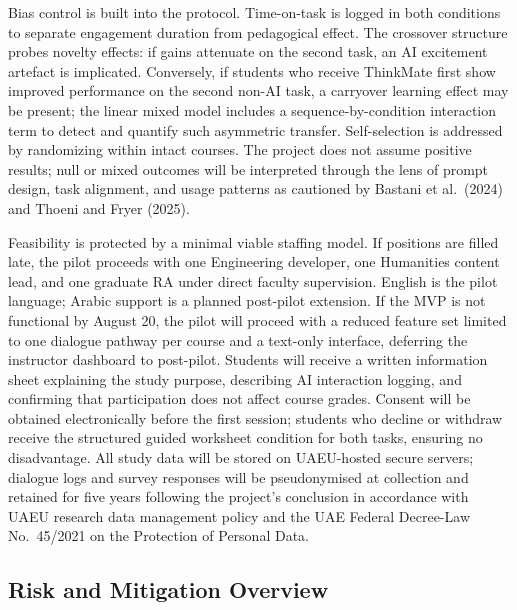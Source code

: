 \documentclass[11pt,a4paper]{article}
\begin{document}
Bias control is built into the protocol. Time-on-task is logged in both conditions to separate engagement duration from pedagogical effect. The crossover structure probes novelty effects: if gains attenuate on the second task, an AI excitement artefact is implicated. Conversely, if students who receive ThinkMate first show improved performance on the second non-AI task, a carryover learning effect may be present; the linear mixed model includes a sequence-by-condition interaction term to detect and quantify such asymmetric transfer. Self-selection is addressed by randomizing within intact courses. The project does not assume positive results; null or mixed outcomes will be interpreted through the lens of prompt design, task alignment, and usage patterns as cautioned by Bastani et al.\ (2024) and Thoeni and Fryer (2025).

Feasibility is protected by a minimal viable staffing model. If positions are filled late, the pilot proceeds with one Engineering developer, one Humanities content lead, and one graduate RA under direct faculty supervision. English is the pilot language; Arabic support is a planned post-pilot extension. If the MVP is not functional by August 20, the pilot will proceed with a reduced feature set limited to one dialogue pathway per course and a text-only interface, deferring the instructor dashboard to post-pilot. Students will receive a written information sheet explaining the study purpose, describing AI interaction logging, and confirming that participation does not affect course grades. Consent will be obtained electronically before the first session; students who decline or withdraw receive the structured guided worksheet condition for both tasks, ensuring no disadvantage. All study data will be stored on UAEU-hosted secure servers; dialogue logs and survey responses will be pseudonymised at collection and retained for five years following the project's conclusion in accordance with UAEU research data management policy and the UAE Federal Decree-Law No.\ 45/2021 on the Protection of Personal Data.

\subsection*{Risk and Mitigation Overview}
\end{document}
